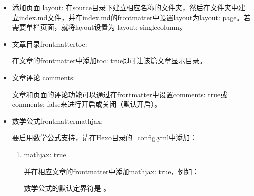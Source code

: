 \documentclass[letterpaper,12pt,english]{sphinxmanual}
\begin{document}
\begin{itemize}
首页默认显示文章摘要而非全文，可以在文章的front\sphinxhyphen{}matter中填写一项description:来设置你想显示的摘要，或者直接在文章内容中插入<!–more–>以隐藏后面的内容。

若两者都未设置，则自动截取文章第一段作为摘要。

\item {} 
添加页面 layout:
在source目录下建立相应名称的文件夹，然后在文件夹中建立index.md文件，并在index.md的front\sphinxhyphen{}matter中设置layout为layout: page。若需要单栏页面，就将layout设置为 layout: single\sphinxhyphen{}column。

\item {} 
文章目录frontmatter\sphinxhyphen{}toc:

\label{\detokenize{001software/001install/001._u7f51_u7ad9/hexo:frontmatter-toc}}
在文章的front\sphinxhyphen{}matter中添加toc: true即可让该篇文章显示目录。

\item {} 
文章评论 comments:

文章和页面的评论功能可以通过在front\sphinxhyphen{}matter中设置comments: true或comments: false来进行开启或关闭（默认开启）。

\item {} 
数学公式frontmatter\sphinxhyphen{}mathjax:

\label{\detokenize{001software/001install/001._u7f51_u7ad9/hexo:frontmatter-mathjax}}
要启用数学公式支持，请在Hexo目录的\_config.yml中添加：
\begin{enumerate}
%
\item {} 
mathjax: true

并在相应文章的front\sphinxhyphen{}matter中添加mathjax: true，例如：

\begin{sphinxVerbatim}[commandchars=\\\{\}]
  
  
 
 
\end{sphinxVerbatim}

数学公式的默认定界符是  。


\end{enumerate}
\end{itemize}
\end{document}
